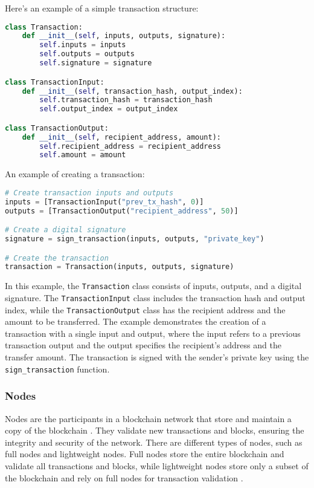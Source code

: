 Here's an example of a simple transaction structure:

\begin{lstlisting}[language=Python, name={Transaction Structure}, label={sc:transactionStructure}]
class Transaction:
    def __init__(self, inputs, outputs, signature):
        self.inputs = inputs
        self.outputs = outputs
        self.signature = signature

class TransactionInput:
    def __init__(self, transaction_hash, output_index):
        self.transaction_hash = transaction_hash
        self.output_index = output_index

class TransactionOutput:
    def __init__(self, recipient_address, amount):
        self.recipient_address = recipient_address
        self.amount = amount
\end{lstlisting}

An example of creating a transaction:

\begin{lstlisting}[language=Python, caption={Creating a Transaction}, label={sc:creatingTransaction}]
# Create transaction inputs and outputs
inputs = [TransactionInput("prev_tx_hash", 0)]
outputs = [TransactionOutput("recipient_address", 50)]

# Create a digital signature
signature = sign_transaction(inputs, outputs, "private_key")

# Create the transaction
transaction = Transaction(inputs, outputs, signature)
\end{lstlisting}

In this example, the \texttt{Transaction} class consists of inputs, outputs, and a digital signature. The \texttt{TransactionInput} class includes the transaction hash and output index, while the \texttt{TransactionOutput} class has the recipient address and the amount to be transferred. The example demonstrates the creation of a transaction with a single input and output, where the input refers to a previous transaction output and the output specifies the recipient's address and the transfer amount. The transaction is signed with the sender's private key using the \texttt{sign\_transaction} function.

\subsubsection{Nodes}
Nodes are the participants in a blockchain network that store and maintain a copy of the blockchain \cite{antonopoulos2014mastering}. They validate new transactions and blocks, ensuring the integrity and security of the network. There are different types of nodes, such as full nodes and lightweight nodes. Full nodes store the entire blockchain and validate all transactions and blocks, while lightweight nodes store only a subset of the blockchain and rely on full nodes for transaction validation \cite{miers2016lightweight}.

